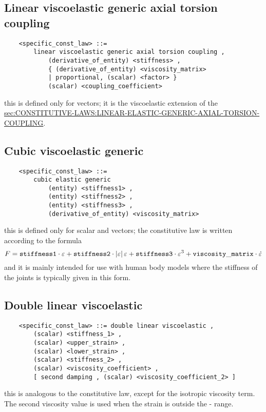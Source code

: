 \subsection{Linear viscoelastic generic axial torsion coupling}
\begin{verbatim}
    <specific_const_law> ::= 
        linear viscoelastic generic axial torsion coupling ,  
            (derivative_of_entity) <stiffness> ,
            { (derivative_of_entity) <viscosity_matrix> 
            | proportional, (scalar) <factor> }
            (scalar) <coupling_coefficient>
\end{verbatim}
this is defined only for  vectors; it is the viscoelastic 
extension of the 
\hyperref{\kw{linear elastic generic axial torsion coupling} constitutive law}{\kw{linear elastic generic axial torsion coupling} constitutive law (see Section~}{)}{sec:CONSTITUTIVE-LAWS:LINEAR-ELASTIC-GENERIC-AXIAL-TORSION-COUPLING}.


\subsection{Cubic viscoelastic generic}
\begin{verbatim}
    <specific_const_law> ::= 
        cubic elastic generic
            (entity) <stiffness1> ,
            (entity) <stiffness2> ,
            (entity) <stiffness3> ,
            (derivative_of_entity) <viscosity_matrix> 
\end{verbatim}
this is defined only for scalar and  vectors; the constitutive
law is written according to the formula
\begin{displaymath}
	F = \mathtt{stiffness1} \cdot \varepsilon
	+ \mathtt{stiffness2} \cdot \left| \varepsilon \right|\varepsilon
	+ \mathtt{stiffness3} \cdot \varepsilon^3
	+ \mathtt{viscosity\_matrix} \cdot \dot{\varepsilon}
\end{displaymath}
and it is mainly intended for use with human body models 
where the stiffness of the joints is typically given in this form.

\subsection{Double linear viscoelastic}
\begin{verbatim}
    <specific_const_law> ::= double linear viscoelastic ,
        (scalar) <stiffness_1> ,
        (scalar) <upper_strain> ,
        (scalar) <lower_strain> ,
        (scalar) <stiffness_2> ,
        (scalar) <viscosity_coefficient> ,
        [ second damping , (scalar) <viscosity_coefficient_2> ]
\end{verbatim}
this is analogous to the  constitutive law,
except for the isotropic viscosity term.
The second viscosity value is used when the strain is outside the
- range.

